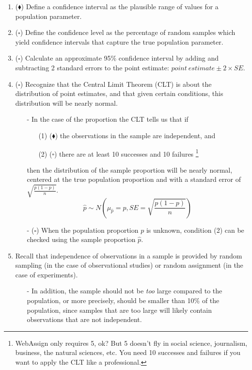 \documentclass[11pt]{article}
\newcommand{\bs}{$\square$}
\newcommand{\bd}{$\blacklozenge$}
\begin{document}
\begin{enumerate}[resume]
\item (\bd) Define a confidence interval as the plausible range of values for a population parameter.

\item (\bs) Define the confidence level as the percentage of random samples which yield confidence intervals that capture the true population parameter.

\item (\bs) Calculate an approximate 95\% confidence interval by adding and subtracting 2 standard errors to the point estimate: $point~estimate \pm 2 \times SE$.

\item (\bs) Recognize that the Central Limit Theorem (CLT) is about the distribution of point estimates, and that given certain conditions, this distribution will be nearly normal.
\begin{itemize}
\item[-] In the case of the proportion the CLT tells us that if
\begin{itemize}[parsep=0pt]
\item[(1)] (\bd) the observations in the sample are independent, and
\item[(2)] (\bs) there are at least 10 successes and 10 failures%
    \footnote{%
    WebAssign only requires 5, ok? But 5 doesn't fly in social science, journalism, business, the natural sciences, etc. You need 10 successes and failures if you want to apply the CLT like a professional.
    }
\end{itemize}
then the distribution of the sample proportion will be nearly normal, centered at the true population proportion and with a standard error of $\sqrt{\frac{p(1-p)}{n}}$.
\[ \hat{p} \sim N \left(\mu_{\hat{p}} = p, SE = \sqrt{\frac{p(1-p)}{n}} \right) \]
\item[-] (\bs) When the population proportion $p$ is unknown, condition (2) can be checked using the sample proportion $\hat{p}$.
\end{itemize}

\item Recall that independence of observations in a sample is provided by random sampling (in the case of observational studies) or random assignment (in the case of experiments).
\begin{itemize}
\item[-] In addition, the sample should not be \textit{too} large compared to the population, or more precisely, should be smaller than 10\% of the population, since samples that are too large will likely contain observations that are not independent.
\end{itemize}


\end{enumerate}
\end{document}
